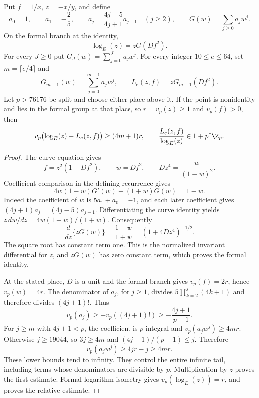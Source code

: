 \begin{lemma}
\label{lem:quartic-reciprocal-log}
\label{lem:quartic-uniform-reciprocal}
Put $f=1/x$, $z=-x/y$, and define
\[
 a_0=1,\qquad a_1=-\frac25,\qquad
 a_j=\frac{4j-5}{4j+1}a_{j-1}\quad(j\ge2),\qquad
 G(w)=\sum_{j\ge0}a_jw^j.
\]
On the formal branch at the identity,
\[
 \log_E(z)=zG(Df^2).
\]
For every $J\ge0$ put $G_J(w)=\sum_{j=0}^{J}a_jw^j$.
For every integer $10\le e\le64$, set $m=\lceil e/4\rceil$ and
\[
 G_{m-1}(w)=\sum_{j=0}^{m-1}a_jw^j,\qquad
 L_e(z,f)=zG_{m-1}(Df^2).
\]
Let $p>76176$ be split and choose either place above it. If the point is
nonidentity and lies in the formal group at that place, so
$r=v_p(z)\ge1$ and $v_p(f)>0$, then
\[
 v_p\bigl(\log_E(z)-L_e(z,f)\bigr)\ge(4m+1)r,
 \qquad \frac{L_e(z,f)}{\log_E(z)}\in1+p^e\Z_p.
\]
\end{lemma}
\begin{proof}
The curve equation gives
\[
 f=z^2(1-Df^2),\qquad w=Df^2,\qquad Dz^4=\frac{w}{(1-w)^2}.
\]
Coefficient comparison in the defining recurrence gives
\[
 4w(1-w)G'(w)+(1+w)G(w)=1-w.
\]
Indeed the coefficient of $w$ is $5a_1+a_0=-1$, and each later
coefficient gives $(4j+1)a_j=(4j-5)a_{j-1}$. Differentiating the
curve identity yields $z\,dw/dz=4w(1-w)/(1+w)$. Consequently
\[
 \frac{d}{dz}\{zG(w)\}=\frac{1-w}{1+w}
                   =(1+4Dz^4)^{-1/2}.
\]
The square root has constant term one. This is the normalized invariant
differential for $z$, and $zG(w)$ has zero constant term, which proves
the formal identity.

At the stated place, $D$ is a unit and the formal branch gives
$v_p(f)=2r$, hence $v_p(w)=4r$. The denominator of $a_j$, for $j\ge1$,
divides $5\prod_{k=2}^j(4k+1)$ and therefore divides $(4j+1)!$.
Thus
\[
 v_p(a_j)\ge-v_p((4j+1)!)\ge-\frac{4j+1}{p-1}.
\]
For $j\ge m$ with $4j+1<p$, the coefficient is $p$-integral and
$v_p(a_jw^j)\ge4mr$. Otherwise $j\ge19044$, so $3j\ge4m$ and
$(4j+1)/(p-1)\le j$. Therefore
\[
 v_p(a_jw^j)\ge4jr-j\ge4mr.
\]
These lower bounds tend to infinity. They control the entire infinite
tail, including terms whose denominators are divisible by $p$.
Multiplication by $z$ proves the first estimate. Formal logarithm isometry
gives $v_p(\log_E(z))=r$, and proves the relative estimate.
\end{proof}


